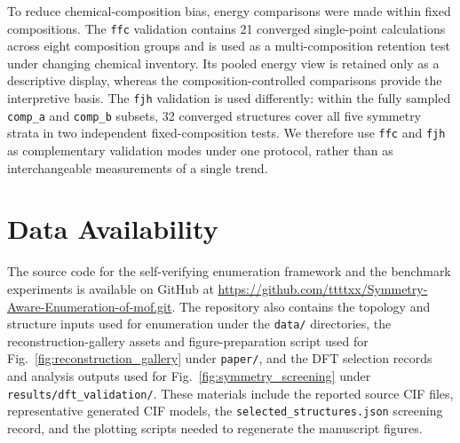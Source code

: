\documentclass[pdflatex,sn-mathphys-num]{sn-jnl}
\theoremstyle{thmstyleone}%
\begin{document}
To reduce chemical-composition bias, energy comparisons were made within fixed compositions. The \texttt{ffc} validation contains 21 converged single-point calculations across eight composition groups and is used as a multi-composition retention test under changing chemical inventory. Its pooled energy view is retained only as a descriptive display, whereas the composition-controlled comparisons provide the interpretive basis. The \texttt{fjh} validation is used differently: within the fully sampled \texttt{comp\_a} and \texttt{comp\_b} subsets, 32 converged structures cover all five symmetry strata in two independent fixed-composition tests. We therefore use \texttt{ffc} and \texttt{fjh} as complementary validation modes under one protocol, rather than as interchangeable measurements of a single trend.

\section*{Data Availability}
The source code for the self-verifying enumeration framework and the benchmark experiments is available on GitHub at \url{https://github.com/ttttxx/Symmetry-Aware-Enumeration-of-mof.git}. The repository also contains the topology and structure inputs used for enumeration under the \texttt{data/} directories, the reconstruction-gallery assets and figure-preparation script used for Fig.~\ref{fig:reconstruction_gallery} under \texttt{paper/}, and the DFT selection records and analysis outputs used for Fig.~\ref{fig:symmetry_screening} under \texttt{results/dft\_validation/}. These materials include the reported source CIF files, representative generated CIF models, the \texttt{selected\_structures.json} screening record, and the plotting scripts needed to regenerate the manuscript figures.
\end{document}
